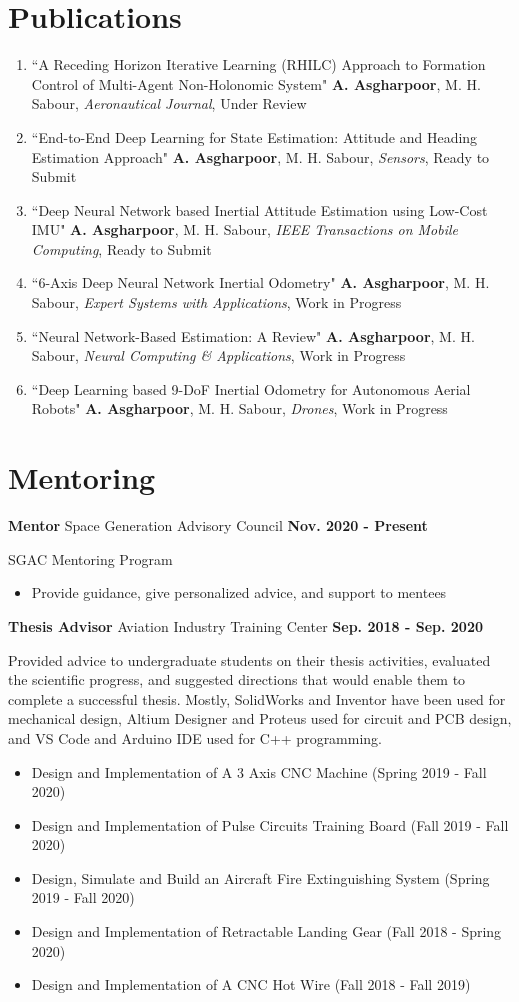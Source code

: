 \documentclass[a4,25pt]{article}
\newenvironment{publications}{
    \section*{Publications}
    \begin{enumerate}[leftmargin=1cm]
        }{ \vspace{0.2cm}\end{enumerate}}
\newcommand{\pub}[4]{ 
    \item   ``#1" #2, \textit{#3}, #4 \vspace{-0.35cm}
}
\newenvironment{Experience}[1]{
    \section*{#1} \vspace{-.2cm}
    \hspace{.5cm}
    \begin{minipage}{0.95\linewidth}
    }{ \end{minipage}}
\newcommand{\experience}[3]{ 
  \vspace{0.1cm}\textbf{#1}{ #2} \hfill \textbf{#3} \par
}
\newcommand{\expdetail}[1]{
        {#1 } \par
}
\newcommand{\expdetails}[1]{
    \begin{itemize} 
    \item #1 \vspace{1pt}
    \end{itemize} 
}
\begin{document}
\begin{publications}
    \pub{A Receding Horizon Iterative Learning (RHILC) Approach to Formation Control of Multi-Agent Non-Holonomic System}{\textbf{A. Asgharpoor}, M. H. Sabour}{Aeronautical Journal}{Under Review}
    \pub{End-to-End Deep Learning for State Estimation: Attitude and Heading Estimation Approach}{\textbf{A. Asgharpoor}, M. H. Sabour}{Sensors}{Ready to Submit}
    \pub{Deep Neural Network based Inertial Attitude Estimation using Low-Cost IMU}{\textbf{A. Asgharpoor}, M. H. Sabour}{IEEE Transactions on Mobile Computing}{Ready to Submit}
    \pub{6-Axis Deep Neural Network Inertial Odometry}{\textbf{A. Asgharpoor}, M. H. Sabour}{Expert Systems with Applications}{Work in Progress}
    \pub{Neural Network-Based Estimation: A Review}{\textbf{A. Asgharpoor}, M. H. Sabour}{Neural Computing \& Applications}{Work in Progress}\pub{Deep Learning based 9-DoF Inertial Odometry for Autonomous Aerial Robots}{\textbf{A. Asgharpoor}, M. H. Sabour}{Drones}{Work in Progress}
    \vspace{-0.5cm}
\end{publications}


\begin{Experience}{Mentoring}
    \experience{Mentor}{Space Generation Advisory Council}{Nov. 2020 - Present}
    \expdetail{SGAC Mentoring Program}
    \expdetails{Provide guidance, give personalized advice, and support to mentees}
    \experience{Thesis Advisor}{Aviation Industry Training Center}{Sep. 2018 - Sep. 2020}
    \expdetail{Provided advice to undergraduate students on their thesis activities, evaluated the scientific progress, and suggested directions that would enable them to complete a successful thesis. Mostly, SolidWorks and Inventor have been used for mechanical design, Altium Designer and Proteus used for circuit and PCB design, and VS Code and Arduino IDE used for C++ programming.}
    \expdetails{Design and Implementation of A 3 Axis CNC Machine (Spring 2019 - Fall 2020)}
    \expdetails{Design and Implementation of Pulse Circuits Training Board (Fall 2019 - Fall 2020)}
    \expdetails{Design, Simulate and Build an Aircraft Fire Extinguishing System (Spring 2019 - Fall 2020)}
    \expdetails{Design and Implementation of Retractable Landing Gear (Fall 2018 - Spring 2020)}
    \expdetails{Design and Implementation of A CNC Hot Wire (Fall 2018 - Fall 2019)}
\end{Experience}
\end{document}
